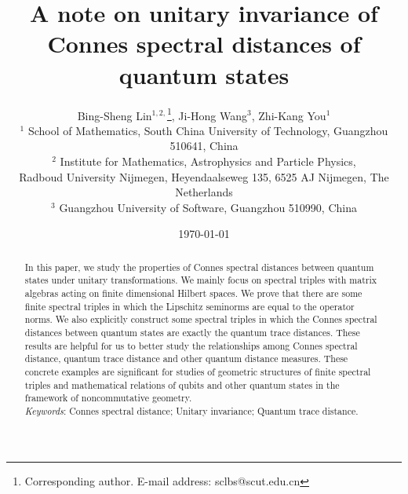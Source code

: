 \documentclass[a4paper,12pt]{article}
\begin{document}
\title{A note on unitary invariance of Connes spectral distances of quantum states}

\author{Bing-Sheng Lin$^{1,2,}$\thanks{Corresponding author. 
		E-mail address: sclbs@scut.edu.cn}, Ji-Hong Wang$^{3}$, Zhi-Kang You$^{1}$\\
	\small $^{1}$ School of Mathematics, South China University of Technology,
		Guangzhou 510641, China\\
	\small $^{2}$ Institute for Mathematics, Astrophysics and Particle Physics,\\
	\small  Radboud University Nijmegen, Heyendaalseweg 135, 6525 AJ Nijmegen, The Netherlands\\
	\small $^{3}$ Guangzhou University of Software, Guangzhou 510990, China
}


\date{\today}


\maketitle

\begin{abstract}
In this paper, we study the properties of Connes spectral distances between quantum states under unitary transformations. We mainly focus on spectral triples with matrix algebras acting on finite dimensional Hilbert spaces. We prove that there are some finite spectral triples in which the Lipschitz seminorms are equal to the operator norms. We also explicitly construct some spectral triples in which the Connes spectral distances between quantum states are exactly the quantum trace distances.
These results are helpful for us to better study the relationships among Connes spectral distance, quantum trace distance and other quantum distance measures. These concrete examples are significant for studies of geometric structures of finite spectral triples and mathematical relations of qubits and other quantum states in the framework of noncommutative geometry.\\
  
\textit{Keywords}: Connes spectral distance; Unitary invariance; Quantum trace distance.
  

\end{abstract}
\end{document}
